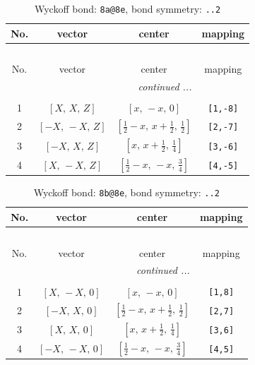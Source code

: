 \documentclass[fleqn,8pt]{jsarticle}
\begin{document}
\begin{longtable}{cccc}
\caption{Wyckoff bond: {\tt 8a@8e}, bond symmetry: {\tt ..2}}
 \\
 \hline \hline
No. & vector & center & mapping \\ \hline \endfirsthead

\multicolumn{3}{l}{\tablename\ \thetable{}} \\
 \hline \hline
No. & vector & center & mapping \\ \hline \endhead

 \hline \hline
\multicolumn{3}{r}{\footnotesize\it continued ...} \\ \endfoot

 \hline \hline
\multicolumn{3}{r}{} \\ \endlastfoot

1 & $\left[ X,\, X,\, Z \right]$ & $\left[ x,\, - x,\, 0 \right]$ & {\tt [1,-8]} \\ \hline
2 & $\left[ - X,\, - X,\, Z \right]$ & $\left[ \frac{1}{2} - x,\, x + \frac{1}{2},\, \frac{1}{2} \right]$ & {\tt [2,-7]} \\ \hline
3 & $\left[ - X,\, X,\, Z \right]$ & $\left[ x,\, x + \frac{1}{2},\, \frac{1}{4} \right]$ & {\tt [3,-6]} \\ \hline
4 & $\left[ X,\, - X,\, Z \right]$ & $\left[ \frac{1}{2} - x,\, - x,\, \frac{3}{4} \right]$ & {\tt [4,-5]} \\
\end{longtable}
\renewcommand{\arraystretch}{1.2}
\begin{longtable}{cccc}
\caption{Wyckoff bond: {\tt 8b@8e}, bond symmetry: {\tt ..2}}
 \\
 \hline \hline
No. & vector & center & mapping \\ \hline \endfirsthead

\multicolumn{3}{l}{\tablename\ \thetable{}} \\
 \hline \hline
No. & vector & center & mapping \\ \hline \endhead

 \hline \hline
\multicolumn{3}{r}{\footnotesize\it continued ...} \\ \endfoot

 \hline \hline
\multicolumn{3}{r}{} \\ \endlastfoot

1 & $\left[ X,\, - X,\, 0 \right]$ & $\left[ x,\, - x,\, 0 \right]$ & {\tt [1,8]} \\ \hline
2 & $\left[ - X,\, X,\, 0 \right]$ & $\left[ \frac{1}{2} - x,\, x + \frac{1}{2},\, \frac{1}{2} \right]$ & {\tt [2,7]} \\ \hline
3 & $\left[ X,\, X,\, 0 \right]$ & $\left[ x,\, x + \frac{1}{2},\, \frac{1}{4} \right]$ & {\tt [3,6]} \\ \hline
4 & $\left[ - X,\, - X,\, 0 \right]$ & $\left[ \frac{1}{2} - x,\, - x,\, \frac{3}{4} \right]$ & {\tt [4,5]} \\
\end{longtable}
\end{document}
